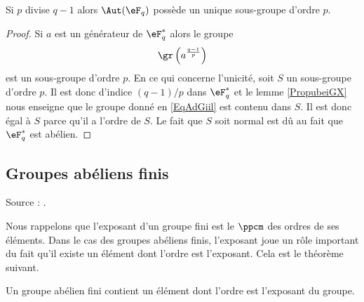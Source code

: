 \begin{corollary}       \label{CorwgmoTK}
    Si \( p\) divise \( q-1\) alors \( \Aut(\eF_q)\) possède un unique sous-groupe d'ordre \( p\).
\end{corollary}

\begin{proof}
    Si \( a\) est un générateur de \( \eF_q^*\) alors le groupe
    \begin{equation}    \label{EqAdGiil}
        \gr\left( a^{\frac{ q-1 }{ p }} \right)
    \end{equation}
    est un sous-groupe d'ordre \( p\). En ce qui concerne l'unicité, soit \( S\) un sous-groupe d'ordre \( p\). Il est donc d'indice \( (q-1)/p\) dans \( \eF_q^*\) et le lemme \ref{PropubeiGX} nous enseigne que le groupe donné en \eqref{EqAdGiil} est contenu dans \( S\). Il est donc égal à \( S\) parce qu'il a l'ordre de \( S\). Le fait que \( S\) soit normal est dû au fait que \( \eF_q^*\) est abélien.
\end{proof}

\subsection{Groupes abéliens finis}
 
Source : \cite{FabricegPSFinis}.

Nous rappelons que l'exposant d'un groupe fini est le \( \ppcm\) des ordres de ses éléments. Dans le cas des groupes abéliens finis, l'exposant joue un rôle important du fait qu'il existe un élément dont l'ordre est l'exposant. Cela est le théorème suivant.

\begin{theorem}
    Un groupe abélien fini contient un élément dont l'ordre est l'exposant du groupe.
\end{theorem}

